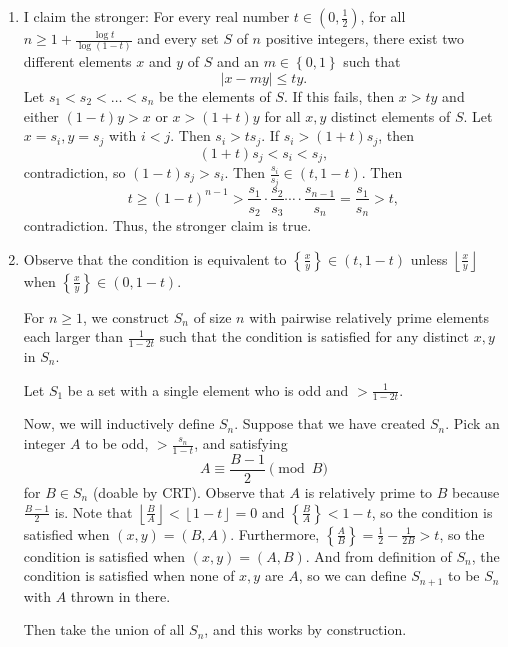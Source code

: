 \begin{enumerate}[label=(\alph*)]
	\item I claim the stronger: For every real number $t\in\left(0,\frac{1}{2}\right)$, for all $n\geq1+\frac{\log t}{\log\left(1-t\right)}$ and every set $S$ of $n$ positive integers, there exist two different elements $x$ and $y$ of $S$ and an $m\in\left\{0,1\right\}$ such that \[\left|x-my\right|\leq ty.\] Let $s_1<s_2<\ldots<s_n$ be the elements of $S$. If this fails, then $x>ty$ and either $\left(1-t\right)y>x$ or $x>\left(1+t\right)y$ for all $x,y$ distinct elements of $S$. Let $x=s_i,y=s_j$ with $i<j$. Then $s_i>ts_j$. If $s_i>\left(1+t\right)s_j$, then \[\left(1+t\right)s_j<s_i<s_j,\] contradiction, so $\left(1-t\right)s_j>s_i$. Then $\frac{s_i}{s_j}\in\left(t,1-t\right)$. Then \[t\geq\left(1-t\right)^{n-1}>\frac{s_1}{s_2}\cdot\frac{s_2}{s_3}\cdots\cdot\frac{s_{n-1}}{s_n}=\frac{s_1}{s_n}>t,\] contradiction. Thus, the stronger claim is true.
	\item Observe that the condition is equivalent to $\left\{\frac{x}{y}\right\}\in\left(t,1-t\right)$ unless $\left\lfloor\frac{x}{y}\right\rfloor$ when $\left\{\frac{x}{y}\right\}\in\left(0,1-t\right)$.
	
	For $n\geq1$, we construct $S_n$ of size $n$ with pairwise relatively prime elements each larger than $\frac{1}{1-2t}$ such that the condition is satisfied for any distinct $x,y$ in $S_n$.
	
	Let $S_1$ be a set with a single element who is odd and $>\frac{1}{1-2t}$.
	
	Now, we will inductively define $S_n$. Suppose that we have created $S_n$. Pick an integer $A$ to be odd, $>\frac{s_n}{1-t}$, and satisfying \[A\equiv\frac{B-1}{2}\pmod B\] for $B\in S_n$ (doable by CRT). Observe that $A$ is relatively prime to $B$ because $\frac{B-1}{2}$ is. Note that $\left\lfloor\frac{B}{A}\right\rfloor<\left\lfloor1-t\right\rfloor=0$ and $\left\{\frac{B}{A}\right\}<1-t$, so the condition is satisfied when $\left(x,y\right)=\left(B,A\right)$. Furthermore, $\left\{\frac{A}{B}\right\}=\frac{1}{2}-\frac{1}{2B}>t$, so the condition is satisfied when $\left(x,y\right)=\left(A,B\right)$. And from definition of $S_n$, the condition is satisfied when none of $x,y$ are $A$, so we can define $S_{n+1}$ to be $S_n$ with $A$ thrown in there.
	
	Then take the union of all $S_n$, and this works by construction.
\end{enumerate}